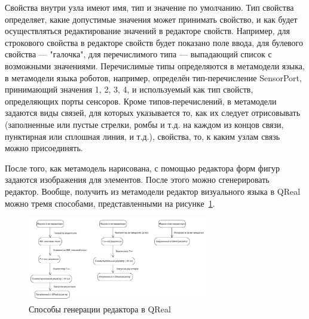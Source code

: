 \documentclass[a4paper]{article}
\begin{document}
Свойства внутри узла имеют имя, тип и значение по умолчанию. Тип свойства определяет, какие допустимые значения может принимать свойство, и как будет осуществляться редактирование значений в редакторе свойств. Например, для строкового свойства в редакторе свойств будет показано поле ввода, для булевого свойства --- "галочка", для перечислимого типа --- выпадающий список с возможными значениями. Перечислимые типы определяются в метамодели языка, в метамодели языка роботов, например, определён тип-перечисление SensorPort, принимающий значения 1, 2, 3, 4, и используемый как тип свойств, определяющих порты сенсоров. Кроме типов-перечислений, в метамодели задаются виды связей, для которых указывается то, как их следует отрисовывать (заполненные или пустые стрелки, ромбы и т.д. на каждом из концов связи, пунктирная или сплошная линия, и т.д.), свойства, то, к каким узлам связь можно присоединять.

После того, как метамодель нарисована, с помощью редактора форм фигур задаются изображения для элементов. После этого можно сгенерировать редактор. Вообще, получить из метамодели редактор визуального языка в QReal можно тремя способами, представленными на рисунке~\ref{editorGeneration}.

\begin{figure} [ht]
  \begin{center}
    \includegraphics[width=0.7\textwidth]{editorGeneration.png}
    \caption{Способы генерации редактора в QReal}
    \label{editorGeneration}
  \end{center}
\end{figure}
\end{document}
